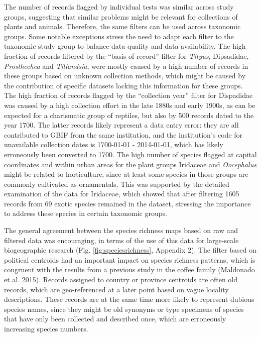 \documentclass[fleqn,10pt,lineno]{wlpeerj} %
\begin{document}
The number of records flagged by individual tests was similar across study groups, suggesting that similar problems might be relevant for collections of plants and animals. Therefore, the same filters can be used across taxonomic groups. Some notable exceptions stress the need to adapt each filter to the taxonomic study group to balance data quality and data availability. The high fraction of records filtered by the ``basis of record'' filter for \emph{Tityus}, Dipsadidae, \emph{Prosthechea} and \emph{Tillandsia}, were mostly caused by a high number of records in these groups based on unknown collection methods, which might be caused by the contribution of specific datasets lacking this information for these groups. The high fraction of records flagged by the ``collection year'' filter for Dispadidae was caused by a high collection effort in the late 1880s and early 1900s, as can be expected for a charismatic group of reptiles, but also by 500 records dated to the year 1700. The latter records likely represent a data entry error: they are all contributed to GBIF from the same institution, and the institution's code for unavailable collection dates is 1700-01-01 - 2014-01-01, which has likely erroneously been converted to 1700. The high number of species flagged at capital coordinates and within urban areas for the plant groups Iridaceae and \emph{Oocephalus} might be related to horticulture, since at least some species in those groups are commonly cultivated as ornamentals. This was supported by the detailed examination of the data for Iridaceae, which showed that after filtering 1605 records from 69 exotic species remained in the dataset, stressing the importance to address these species in certain taxonomic groups.

The general agreement between the species richness maps based on raw and filtered data was encouraging, in terms of the use of this data for large-scale biogeographic research (Fig. \ref{fig:speciesrichness}, Appendix 2). The filter based on political centroids had an important impact on species richness patterns, which is congruent with the results from a previous study in the coffee family (Maldonado et al. 2015). Records assigned to country or province centroids are often old records, which are geo-referenced at a later point based on vague locality descriptions. These records are at the same time more likely to represent dubious species names, since they might be old synonyms or type specimens of species that have only been collected and described once, which are erroneously increasing species numbers.
\end{document}
